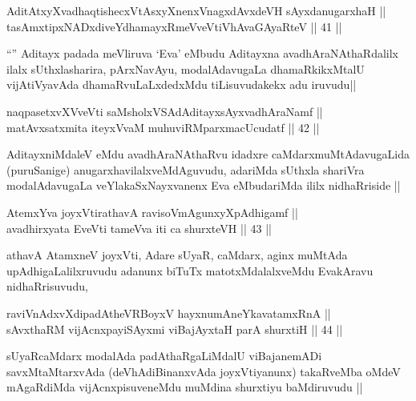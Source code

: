 
\begin{shl}
AditAtxyXvadhaqtishecxVtAsxyXnenxVnagxdAvxdeVH sAyxdanugarxhaH || \\
tasAmxtipxNADxdiveYdhamayxRmeVveVtiVhAvaGAyaRteV ||  41 ||  
\end{shl}

\begin{artha}
``\stext'' Aditayx padada meVliruva `Eva' eMbudu Aditayxna avadhAraNAthaRdalilx ilalx sUthxlasharira, pArxNavAyu, modalAdavugaLa dhamaRkikxMtalU vijAtiVyavAda dhamaRvuLaLxdedxMdu tiLisuvudakekx adu iruvudu||
\end{artha}

\begin{shl}
naqpasetxvXVveVti saMsholxVSAdAditayxsAyxvadhAraNamf || \\
matAvx\s satxmita iteyxVvaM muhuviRMparxmacUcudatf ||  42 ||  
\end{shl}

\begin{artha}
AditayxniMdaleV eMdu avadhAraNAthaRvu idadxre caMdarxmuMtAdavugaLida (puruSanige) anugarxhavilalxveMdAguvudu, adariMda sUthxla shariVra modalAdavugaLa veYlakaSxNayxvanenx Eva eMbudariMda ililx nidhaRriside || 
\end{artha}


\begin{shl}
AtemxYva joyxVtirathavA ravisoVmAgunxyXpAdhigamf || \\
avadhirxyata EveVti tameVva iti ca shurxteVH ||  43 ||  
\end{shl}

\begin{artha}
athavA AtamxneV joyxVti, Adare sUyaR, caMdarx, aginx muMtAda upAdhigaLalilxruvudu adanunx biTuTx matotxMdalalxveMdu EvakAravu nidhaRrisuvudu, 
\end{artha}

\begin{shl}
raviVnAdxvXdipadAtheVRBoyxV hayxnumAneYkavatamxRnA || \\
sAvxthaRM vijAcnxpayiSAyxmi viBajAyxtaH parA shurxtiH ||  44 ||  
\end{shl}

\begin{artha}
sUyaRcaMdarx modalAda padAthaRgaLiMdalU viBajanemADi savxMtaMtarxvAda (deVhAdiBinanxvAda joyxVtiyanunx) takaRveMba oMdeV mAgaRdiMda vijAcnxpisuveneMdu muMdina shurxtiyu baMdiruvudu ||
\end{artha}

